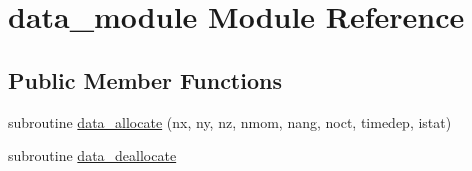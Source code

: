 \hypertarget{classdata__module}{\section{data\-\_\-module Module Reference}
\label{classdata__module}
}
\subsection*{Public Member Functions}
\begin{DoxyCompactItemize}
\item 
subroutine \hyperlink{classdata__module_ade2204272a3d3184a17a625aec6795ab}{data\-\_\-allocate} (nx, ny, nz, nmom, nang, noct, timedep, istat)
\item 
subroutine \hyperlink{classdata__module_a64ba259f44e41619101dc90b61ef1b28}{data\-\_\-deallocate}
\end{DoxyCompactItemize}
